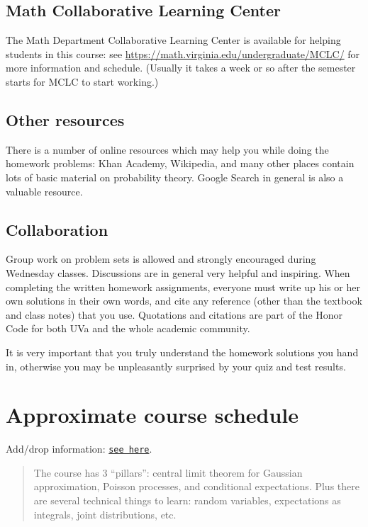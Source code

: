 \documentclass[oneside,11pt]{amsart}
\begin{document}
\subsection{Math Collaborative Learning Center}

The Math Department 
Collaborative Learning Center
is available for helping students in this course: 
see \url{https://math.virginia.edu/undergraduate/MCLC/}
for more information and schedule. 
(Usually it takes a week or so after the semester starts for MCLC to start working.)

\subsection{Other resources}

There is a number of online resources which may help you while doing the homework problems:
Khan Academy, Wikipedia, and many other 
places contain lots of basic material on probability theory. Google Search
in general
is also a valuable resource.

\subsection{Collaboration}
\label{collaboration}

Group work on problem sets is allowed and strongly encouraged during Wednesday classes.
Discussions are in general very helpful and inspiring. When completing the written homework assignments, everyone must write up his or her own
solutions in their own words, and cite any reference 
(other than the textbook and
class notes) that you use. Quotations and citations are part of the Honor Code for both UVa
and the whole academic community. 

It is very important that you truly understand the homework solutions you hand
in, otherwise you may be unpleasantly surprised by your quiz and test results.

\section{Approximate course schedule}
\label{sub:schedule}

\noindent Add/drop information: \href{https://registrar.virginia.edu/enrollment-information/fall-enrollment-2023}{\texttt{see here}}.
\bigskip

\begin{quote}
	The course has 3 ``pillars'': central limit theorem for Gaussian approximation, 
	Poisson processes, and conditional expectations. 
	Plus there are several technical things to learn: random variables, expectations as integrals, 
	joint distributions, etc.
\end{quote}
\end{document}
